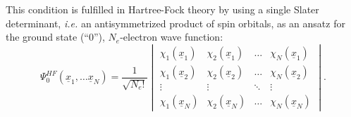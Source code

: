 \documentclass[11pt,DIV=13,BCOR=5mm,a4paper,headinclude]{scrbook}
\renewcommand{\vec}[1]{\underline{#1}}
\begin{document}
This condition is fulfilled in Hartree-Fock theory by using a single Slater determinant, \textit{i.e.} an antisymmetrized product of spin orbitals, as an ansatz for the ground state (``0''), $N_e$-electron wave function:
\begin{equation}
\Psi^{HF}_{0}({\vec{x}_1},\dots\vec{x}_N) = \frac{1}{\sqrt{N_e!}}\begin{vmatrix}{\chi_1}({\vec{x}_1})&{\chi_2}({\vec{x}_1})&\dots&{\chi_N}({\vec{x}_1})\\
{\chi_1}({\vec{x}_2})&{\chi_2}({\vec{x}_2})&\dots&{\chi_N}({\vec{x}_2})\\
 \vdots&\vdots&\ddots&\vdots \\
{\chi_1}({\vec{x}_N})&{\chi_2}({\vec{x}_N})&\dots&{\chi_N}({\vec{x}_N})
\end{vmatrix} .
\end{equation}
\end{document}
